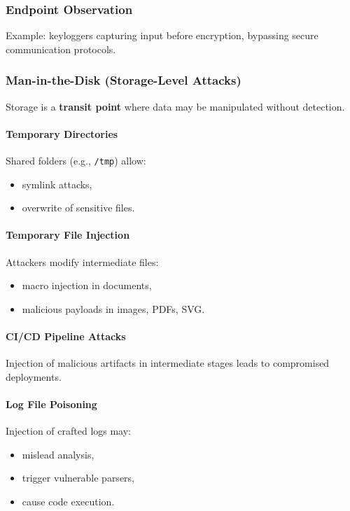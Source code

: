 \subsubsection{Endpoint Observation}

Example: keyloggers capturing input before encryption, bypassing secure communication protocols.

\subsubsection{Man-in-the-Disk (Storage-Level Attacks)}

Storage is a \textbf{transit point} where data may be manipulated without detection.

\paragraph{Temporary Directories}
Shared folders (e.g., \texttt{/tmp}) allow:
\begin{itemize}
    \item symlink attacks,
    \item overwrite of sensitive files.
\end{itemize}

\paragraph{Temporary File Injection}
Attackers modify intermediate files:
\begin{itemize}
    \item macro injection in documents,
    \item malicious payloads in images, PDFs, SVG.
\end{itemize}

\paragraph{CI/CD Pipeline Attacks}
Injection of malicious artifacts in intermediate stages leads to compromised deployments.

\paragraph{Log File Poisoning}
Injection of crafted logs may:
\begin{itemize}
    \item mislead analysis,
    \item trigger vulnerable parsers,
    \item cause code execution.
\end{itemize}

